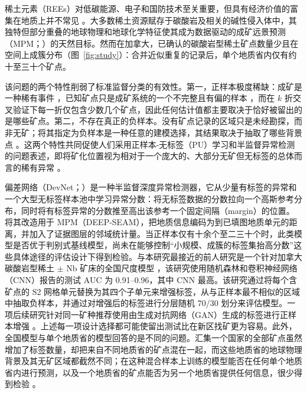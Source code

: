 \documentclass[pdflatex,sn-apa]{sn-jnl}
\begin{document}
稀土元素（REEs）对低碳能源、电子和国防技术至关重要，但具有经济价值的富集在地质上并不常见 \citep{Wang2020}。大多数稀土资源赋存于碳酸岩及相关的碱性侵入体中，其独特但部分重叠的地球物理和地球化学特征使其成为数据驱动的成矿远景预测（MPM；\citealp{Verplanck2014,Simandl2018}）的天然目标。然而在加拿大，已确认的碳酸岩型稀土矿点数量少且在空间上成簇分布（图~\ref{fig:study}）：合并近似重复的记录后，单个地质省内仅有约十至三十个矿点。

该问题的两个特性削弱了标准监督分类的有效性。第一，正样本极度稀缺：成矿是一种稀有事件 \citep{Xiong2018}，已知矿点只是成矿系统的一个不完整且有偏的样本 \citep{Coolbaugh2007,Parsa2021,Zuo2021}，而在 $k$ 折交叉验证下每一折仅包含少数几个矿点，因此任何估计值都主要取决于恰好被留出的是哪些矿点。第二，不存在真正的负样本。没有矿点记录的区域只是未经勘探，而非无矿；将其指定为负样本是一种任意的建模选择，其结果取决于抽取了哪些背景点 \citep{Zuo2020}。这两个特性共同促使人们采用正样本-无标签（PU）学习和半监督异常检测的问题表述，即将矿化位置视为相对于一个庞大的、大部分无矿但无标签的总体而言的稀有异常 \citep{Chen2019,Xiong2016,Xiong2021,Bekker2020,Luo2026}。

偏差网络（DevNet；\citealp{Pang2019}）是一种半监督深度异常检测器，它从少量有标签的异常和一个大型无标签样本池中学习异常分数：将无标签数据的分数拉向一个高斯参考分布，同时将有标签异常的分数推至高出该参考一个固定间隔（margin）的位置。\citet{Luo2026} 将其改造用于 MPM（DEEP-SEAM），把地质信息编码为到已填图地质单元的距离，并加入了证据图层的邻域统计量。当正样本仅有十余个至二三十个时，此类模型是否优于判别式基线模型，尚未在能够控制“小规模、成簇的标签集抬高分数”这些具体途径的评估设计下得到检验。与本研究最接近的前人研究是一个针对加拿大碳酸岩型稀土 $\pm$ Nb 矿床的全国尺度模型 \citep{Parsa2024}，该研究使用随机森林和卷积神经网络（CNN）报告的测试 AUC 为 0.91--0.96，其中 CNN 最高。该研究通过将每个含矿点的 S2 网格单元替换为其四个子单元来增强标签，从与正样本最不相似的区域中抽取负样本，并通过对增强后的标签进行分层随机 70/30 划分来评估模型。一项后续研究针对同一矿种推荐使用由生成对抗网络（GAN）生成的标签进行正样本增强 \citep{Parsa2025}。上述每一项设计选择都可能使留出测试比在新区找矿更为容易。此外，全国模型与单个地质省的模型回答的是不同的问题。汇集一个国家的全部矿点虽然增加了标签数量，却把来自不同地质省的矿点混在一起，而这些地质省的地球物理背景及其无矿区域都截然不同；在这种混合样本上训练的模型能否在任何单个地质省内进行预测，以及一个地质省的矿点能否为另一个地质省提供任何信息，很少得到检验 \citep{Ploton2020,Meyer2021}。
\end{document}
